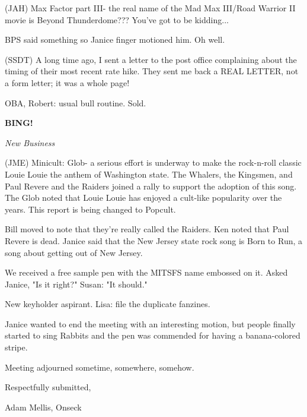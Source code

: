 \documentclass[12pt]{article}
\newcommand{\bing}{{\bf BING!} }
\newcommand{\goto}[1]{\bing \vskip 12pt \centerline{{\em{#1}}}}
\begin{document}
(JAH) Max Factor part III- the real name of the Mad Max III/Road Warrior II movie is Beyond Thunderdome??? You've got to be kidding...

BPS said something so Janice finger motioned him. Oh well.

(SSDT) A long time ago, I sent a letter to the post office complaining about the timing of their most recent rate hike. They sent me back a REAL LETTER, not a form letter; it was a whole page!

OBA, Robert: usual bull routine. Sold.

\goto{New Business}

(JME) Minicult: Glob- a serious effort is underway to make the rock-n-roll classic Louie Louie the anthem of Washington state. The Whalers, the Kingsmen, and Paul Revere and the Raiders joined a rally to support the adoption of this song. The Glob noted that Louie Louie has enjoyed a cult-like popularity over the years. This report is being changed to Popcult.

Bill moved to note that they're really called the Raiders. Ken noted that Paul Revere is dead. Janice said that the New Jersey state rock song is Born to Run, a song about getting out of New Jersey.

We received a free sample pen with the MITSFS name embossed on it. Asked Janice, "Is it right?" Susan: "It should."

New keyholder aspirant. Lisa: file the duplicate fanzines.

Janice wanted to end the meeting with an interesting motion, but people finally started to sing Rabbits and the pen was commended for having a banana-colored stripe.

\vspace{12pt}

\noindent
Meeting adjourned sometime, somewhere, somehow.

\vspace{18pt}

\centerline{Respectfully submitted,}
\centerline{Adam Mellis, Onseck}
\end{document}
